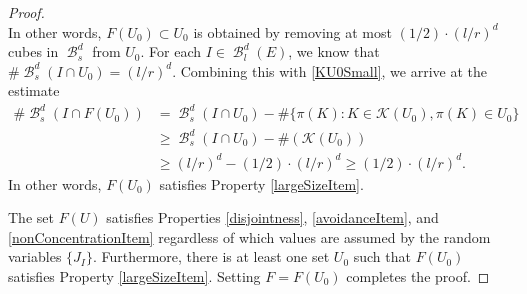 \documentclass[dvipsnames,letterpaper,12pt]{article}
\numberwithin{equation}{section}
\theoremstyle{plain}
\theoremstyle{remark}
\DeclareMathOperator{\setcolon}{\colon}
\DeclareMathOperator{\B}{\mathcal{B}}
\begin{document}
\begin{proof}
\begin{equation}
	\end{equation}
	In other words, $F(U_0) \subset U_0$ is obtained by removing at most $(1/2) \cdot (l/r)^d$ cubes in $\B^d_s$ from $U_0$. For each $I \in \B_l^d(E)$, we know that $\# \B_{s}^d(I \cap U_0) = (l/r)^d$. Combining this with \eqref{KU0Small}, we arrive at the estimate 
	\begin{align*}
		\# \B_s^d(I \cap F(U_0)) &= \B_s^d(I \cap U_0) - \# \{ \pi(K) \setcolon K \in \mathcal{K}(U_0), \pi(K) \in U_0 \}\\
		&\geq \B_s^d(I \cap U_0) - \#(\mathcal{K}(U_0))\\
		&\geq (l/r)^d - (1/2) \cdot (l/r)^d \geq (1/2) \cdot (l/r)^d.
	\end{align*}  
	In other words, $F(U_0)$ satisfies Property \ref{largeSizeItem}.

	The set $F(U)$ satisfies Properties \ref{disjointness}, \ref{avoidanceItem}, and \ref{nonConcentrationItem} regardless of which values are assumed by the random variables $\{ J_I \}$. Furthermore, there is at least one set $U_0$ such that $F(U_0)$ satisfies Property \ref{largeSizeItem}. Setting $F = F(U_0)$ completes the proof.
\end{proof}
\end{document}
